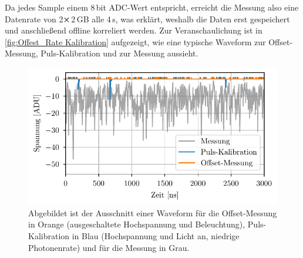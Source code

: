 Da jedes Sample einem 8\,bit ADC-Wert entspricht, erreicht die Messung also eine Datenrate von 2$\cross$2\,GB alle 4\,s, was erklärt, weshalb die Daten erst gespeichert und anschließend offline korreliert werden. 
Zur Veranschaulichung ist in \autoref{fig:Offest_Rate Kalibration} aufgezeigt, wie eine typische Waveform zur Offset-Messung, Puls-Kalibration und zur Messung aussieht. 
\begin{figure}[h]
    \centering
    \includegraphics{images/Datenaufnahme/Kalibration.pdf}
    \caption{Abgebildet ist der Ausschnitt einer Waveform für die Offset-Messung in Orange (ausgeschaltete Hochspannung und Beleuchtung), Puls-Kalibration in Blau (Hochspannung und Licht an, niedrige Photonenrate) und für die Messung in Grau.}
    \label{fig:Offest_Rate Kalibration}
\end{figure}

